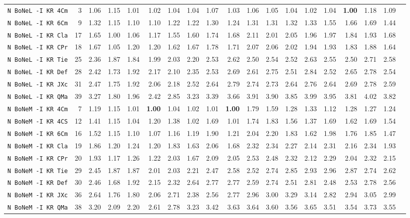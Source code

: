 \begin{tabular}{l | r @{~~} r | r@{~~}r@{~~}r@{~~}r@{~~}r@{~~}r@{~~}r@{~~}r@{~~}r@{~~}r@{~~}r@{~~}r@{~~}r@{~~}r@{~~}r@{~~}r|}
\verb+N BoNeL -I KR 4Cm+ & 3 & 1.06 & 1.15&1.01&1.02&1.04&1.04&1.07&1.03&1.06&1.05&1.04&1.02&1.04&\textbf{1.00}&1.18&1.09\\
\verb+N BoNeL -I KR 6Cm+ & 9 & 1.32 & 1.15&1.10&1.10&1.22&1.22&1.30&1.24&1.31&1.31&1.32&1.33&1.55&1.66&1.69&1.44\\
\verb+N BoNeL -I KR Cla+ & 17 & 1.65 & 1.00&1.06&1.17&1.55&1.60&1.74&1.68&2.11&2.01&2.05&1.96&1.97&1.84&1.93&1.68\\
\verb+N BoNeL -I KR CPr+ & 18 & 1.67 & 1.05&1.20&1.20&1.62&1.67&1.78&1.71&2.07&2.06&2.02&1.94&1.93&1.83&1.88&1.64\\
\verb+N BoNeL -I KR Tie+ & 25 & 2.36 & 1.87&1.84&1.99&2.03&2.20&2.53&2.62&2.50&2.54&2.52&2.63&2.55&2.50&2.71&2.58\\
\verb+N BoNeL -I KR Def+ & 28 & 2.42 & 1.73&1.92&2.17&2.10&2.35&2.53&2.69&2.61&2.75&2.51&2.84&2.52&2.65&2.78&2.54\\
\verb+N BoNeL -I KR JXc+ & 31 & 2.47 & 1.75&1.92&2.06&2.18&2.52&2.64&2.79&2.74&2.73&2.64&2.76&2.64&2.69&2.78&2.59\\
\verb+N BoNeL -I KR QMa+ & 39 & 3.27 & 1.80&1.96&2.42&2.85&3.23&3.39&3.66&3.91&3.90&3.85&3.99&3.95&3.81&4.02&3.82\smallskip \\
\verb+N BoNeM -I KR 4Cm+ & 7 & 1.19 & 1.15&1.01&\textbf{1.00}&1.04&1.02&1.01&\textbf{1.00}&1.79&1.59&1.28&1.33&1.12&1.28&1.27&1.24\\
\verb+N BoNeM -I KR 4CS+ & 12 & 1.41 & 1.15&1.04&1.20&1.38&1.02&1.69&1.01&1.74&1.83&1.56&1.37&1.69&1.62&1.69&1.54\\
\verb+N BoNeM -I KR 6Cm+ & 16 & 1.52 & 1.15&1.10&1.07&1.16&1.19&1.90&1.21&2.04&2.20&1.83&1.62&1.98&1.76&1.85&1.47\\
\verb+N BoNeM -I KR Cla+ & 19 & 1.86 & 1.20&1.24&1.20&1.83&1.63&2.06&1.68&2.32&2.34&2.27&2.14&2.31&2.16&2.34&1.93\\
\verb+N BoNeM -I KR CPr+ & 20 & 1.93 & 1.17&1.26&1.22&2.03&1.67&2.09&2.05&2.53&2.48&2.32&2.12&2.29&2.04&2.32&2.15\\
\verb+N BoNeM -I KR Tie+ & 29 & 2.45 & 1.87&1.87&2.01&2.03&2.21&2.47&2.58&2.52&2.74&2.85&2.93&2.96&2.87&2.74&2.62\\
\verb+N BoNeM -I KR Def+ & 30 & 2.46 & 1.68&1.92&2.15&2.32&2.64&2.77&2.77&2.59&2.74&2.51&2.81&2.48&2.53&2.78&2.56\\
\verb+N BoNeM -I KR JXc+ & 36 & 2.64 & 1.76&1.80&2.06&2.71&2.38&2.56&2.77&2.96&3.00&3.29&3.14&2.82&2.94&3.05&2.99\\
\verb+N BoNeM -I KR QMa+ & 38 & 3.20 & 2.09&2.20&2.61&2.78&3.23&3.42&3.63&3.64&3.60&3.56&3.65&3.51&3.54&3.73&3.55\smallskip \\

\end{tabular}
